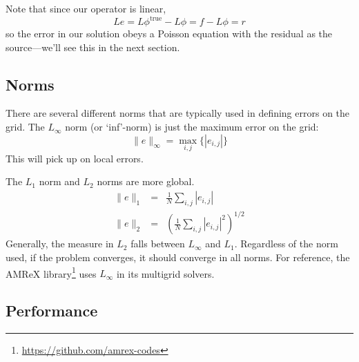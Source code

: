 Note that since our operator is linear,
\begin{equation}
L e = L\phi^\mathrm{true} - L\phi = f - L\phi = r
\end{equation}
so the error in our solution obeys a Poisson equation with the residual
as the source---we'll see this in the next section.

\subsection{Norms}

There are several different norms that are typically used in defining
errors on the grid.  The $L_\infty$ norm (or `inf'-norm) is just the
maximum error on the grid:
\begin{equation}
\|e\|_\infty = \max_{i,j} \{ |e_{i,j}| \}
\end{equation}
This will pick up on local errors.  

The $L_1$ norm and $L_2$ norms are more global. 
\begin{eqnarray}
\|e\|_1 &=& \frac{1}{N} \sum_{i,j} |e_{i,j} | \\
\|e\|_2 &=& \left ( \frac{1}{N} \sum_{i,j} |e_{i,j} |^2 \right )^{1/2}
\end{eqnarray}
Generally, the measure in $L_2$ falls between $L_\infty$ and $L_1$.
Regardless of the norm used, if the problem converges, it should
converge in all norms.  For reference, the AMReX
library\footnote{\url{https://github.com/amrex-codes}} uses $L_\infty$
in its multigrid solvers.



\subsection{Performance}


